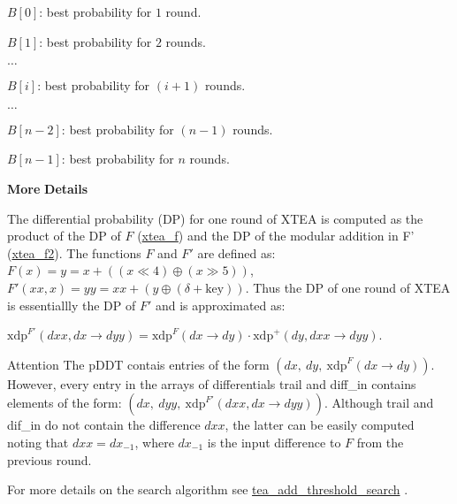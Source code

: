 \begin{DoxyItemize}
\item $B[0]$\-: best probability for $1$ round.
\item $B[1]$\-: best probability for $2$ rounds.
\item $\ldots$
\item $B[i]$\-: best probability for $(i+1)$ rounds.
\item $\ldots$
\item $B[n-2]$\-: best probability for $(n-1)$ rounds.
\item $B[n-1]$\-: best probability for $n$ rounds.
\end{DoxyItemize}

{\bfseries \-More} {\bfseries \-Details} 

\-The differential probability (\-D\-P) for one round of \-X\-T\-E\-A is computed as the product of the \-D\-P of $F$ (\hyperlink{xtea_8hh_a6c0b7a7bc47458fb343e66188fe4abda}{xtea\-\_\-f}) and the \-D\-P of the modular addition in \-F' (\hyperlink{xtea_8hh_a3ff97f349faa35a728c6cdd128fca853}{xtea\-\_\-f2}). \-The functions $F$ and $F'$ are defined as\-: $F(x) = y = x + ((x \ll 4) \oplus (x \gg 5))$, $ F'(xx, x) = yy = xx + (y \oplus (\delta + \mathrm{key}))$. \-Thus the \-D\-P of one round of \-X\-T\-E\-A is essentiallly the \-D\-P of $F'$ and is approximated as\-:

$\mathrm{xdp}^{F'}(dxx, dx \rightarrow dyy) = \mathrm{xdp}^{F}(dx \rightarrow dy) \cdot \mathrm{xdp}^{+}(dy, dxx \rightarrow dyy)$.

\begin{DoxyAttention}{\-Attention}
\-The p\-D\-D\-T contais entries of the form $(dx,~ dy,~ \mathrm{xdp}^{F}(dx \rightarrow dy))$. \-However, every entry in the arrays of differentials {\ttfamily trail} and {\ttfamily diff\-\_\-in} contains elements of the form\-: $(dx,~ dyy,~ \mathrm{xdp}^{F'}(dxx, dx \rightarrow dyy))$. \-Although {\ttfamily trail} and {\ttfamily dif\-\_\-in} do not contain the difference $dxx$, the latter can be easily computed noting that $dxx = dx_{-1}$, where $dx_{-1}$ is the input difference to $F$ from the previous round.
\end{DoxyAttention}
\-For more details on the search algorithm see \hyperlink{tea-add-threshold-search_8cc_ab59db616cde68bf9245c7d24c98e3a6c}{tea\-\_\-add\-\_\-threshold\-\_\-search} .

